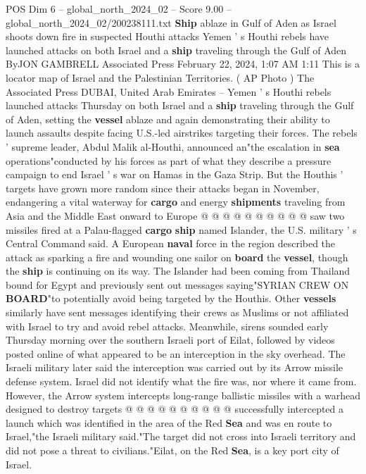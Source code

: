 \begin{textsample}{POS Dim 6 – global\_north\_2024\_02 – Score 9.00 – global\_north\_2024\_02/200238111.txt}  \label{ex:f6_pos_191}
\textbf{Ship} ablaze in Gulf of Aden as Israel shoots down fire in suspected Houthi attacks Yemen ' s Houthi rebels have launched attacks on both Israel and a \textbf{ship} traveling through the Gulf of Aden ByJON GAMBRELL Associated Press February 22, 2024, 1:07 AM 1:11 This is a locator map of Israel and the Palestinian Territories. ( AP Photo ) The Associated Press DUBAI, United Arab Emirates -- Yemen ' s Houthi rebels launched attacks Thursday on both Israel and a \textbf{ship} traveling through the Gulf of Aden, setting the \textbf{vessel} ablaze and again demonstrating their ability to launch assaults despite facing U.S.-led airstrikes targeting their forces.
The rebels ' supreme leader, Abdul Malik al-Houthi, announced an"the escalation in \textbf{sea} operations"conducted by his forces as part of what they describe a pressure campaign to end Israel ' s war on Hamas in the Gaza Strip.
But the Houthis ' targets have grown more random since their attacks began in November, endangering a vital waterway for \textbf{cargo} and energy \textbf{shipments} traveling from Asia and the Middle East onward to Europe @ @ @ @ @ @ @ @ @ @ saw two missiles fired at a Palau-flagged \textbf{cargo} \textbf{ship} named Islander, the U.S. military ' s Central Command said.
A European \textbf{naval} force in the region described the attack as sparking a fire and wounding one sailor on \textbf{board} the \textbf{vessel}, though the \textbf{ship} is continuing on its way.
The Islander had been coming from Thailand bound for Egypt and previously sent out messages saying"SYRIAN CREW ON \textbf{BOARD}"to potentially avoid being targeted by the Houthis.
Other \textbf{vessels} similarly have sent messages identifying their crews as Muslims or not affiliated with Israel to try and avoid rebel attacks.
Meanwhile, sirens sounded early Thursday morning over the southern Israeli port of Eilat, followed by videos posted online of what appeared to be an interception in the sky overhead.
The Israeli military later said the interception was carried out by its Arrow missile defense system.
Israel did not identify what the fire was, nor where it came from.
However, the Arrow system intercepts long-range ballistic missiles with a warhead designed to destroy targets @ @ @ @ @ @ @ @ @ @ successfully intercepted a launch which was identified in the area of the Red \textbf{Sea} and was en route to Israel,"the Israeli military said."The target did not cross into Israeli territory and did not pose a threat to civilians."Eilat, on the Red \textbf{Sea}, is a key port city of Israel.

\end{textsample}
